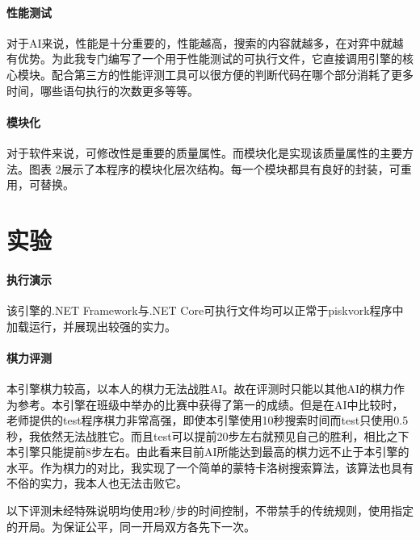 \documentclass{article}
\begin{document}
\paragraph{性能测试} 对于AI来说，性能是十分重要的，性能越高，搜索的内容就越多，在对弈中就越有优势。为此我专门编写了一个用于性能测试的可执行文件，它直接调用引擎的核心模块。配合第三方的性能评测工具可以很方便的判断代码在哪个部分消耗了更多时间，哪些语句执行的次数更多等等。

\paragraph{模块化} 对于软件来说，可修改性是重要的质量属性。而模块化是实现该质量属性的主要方法。图表 2展示了本程序的模块化层次结构。每一个模块都具有良好的封装，可重用，可替换。

\section{实验}

\paragraph{执行演示} 该引擎的.NET Framework与.NET Core可执行文件均可以正常于piskvork程序中加载运行，并展现出较强的实力。

\paragraph{棋力评测} 本引擎棋力较高，以本人的棋力无法战胜AI。故在评测时只能以其他AI的棋力作为参考。本引擎在班级中举办的比赛中获得了第一的成绩。但是在AI中比较时，老师提供的test程序棋力非常高强，即使本引擎使用10秒搜索时间而test只使用0.5秒，我依然无法战胜它。而且test可以提前20步左右就预见自己的胜利，相比之下本引擎只能提前8步左右。由此看来目前AI所能达到最高的棋力远不止于本引擎的水平。作为棋力的对比，我实现了一个简单的蒙特卡洛树搜索算法，该算法也具有不俗的实力，我本人也无法击败它。

以下评测未经特殊说明均使用2秒/步的时间控制，不带禁手的传统规则，使用指定的开局。为保证公平，同一开局双方各先下一次。
\end{document}
